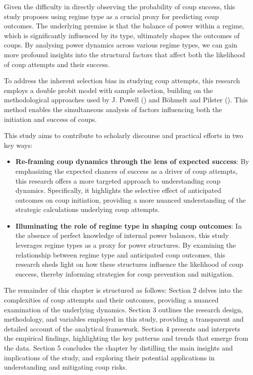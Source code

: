 \documentclass[
  12pt,
]{report}
\begin{document}
Given the difficulty in directly observing the probability of coup
success, this study proposes using regime type as a crucial proxy for
predicting coup outcomes. The underlying premise is that the balance of
power within a regime, which is significantly influenced by its type,
ultimately shapes the outcomes of coups. By analysing power dynamics
across various regime types, we can gain more profound insights into the
structural factors that affect both the likelihood of coup attempts and
their success.

To address the inherent selection bias in studying coup attempts, this
research employs a double probit model with sample selection, building
on the methodological approaches used by J. Powell
() and Böhmelt and Pilster
(). This method enables the
simultaneous analysis of factors influencing both the initiation and
success of coups.

This study aims to contribute to scholarly discourse and practical
efforts in two key ways:

\begin{itemize}
\item
  \textbf{Re-framing coup dynamics through the lens of expected
  success}: By emphasizing the expected chances of success as a driver
  of coup attempts, this research offers a more targeted approach to
  understanding coup dynamics. Specifically, it highlights the selective
  effect of anticipated outcomes on coup initiation, providing a more
  nuanced understanding of the strategic calculations underlying coup
  attempts.
\item
  \textbf{Illuminating the role of regime type in shaping coup
  outcomes}: In the absence of perfect knowledge of internal power
  balances, this study leverages regime types as a proxy for power
  structures. By examining the relationship between regime type and
  anticipated coup outcomes, this research sheds light on how these
  structures influence the likelihood of coup success, thereby informing
  strategies for coup prevention and mitigation.
\end{itemize}

The remainder of this chapter is structured as follows: Section 2 delves
into the complexities of coup attempts and their outcomes, providing a
nuanced examination of the underlying dynamics. Section 3 outlines the
research design, methodology, and variables employed in this study,
providing a transparent and detailed account of the analytical
framework. Section 4 presents and interprets the empirical findings,
highlighting the key patterns and trends that emerge from the data.
Section 5 concludes the chapter by distilling the main insights and
implications of the study, and exploring their potential applications in
understanding and mitigating coup risks.
\end{document}
